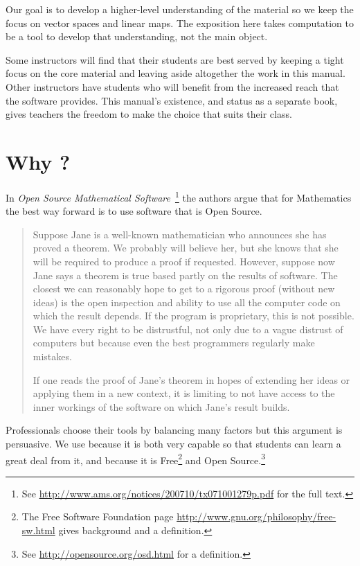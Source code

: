 Our goal is to 
develop a higher-level understanding of the material so we 
keep the focus on vector spaces and linear maps.
The exposition here takes computation to be
a tool to develop that understanding, not the main object.

Some instructors will find 
that their students are best served by
keeping a tight focus on the
core material and leaving aside altogether 
the work in this manual. 
Other instructors
have students who will benefit from the increased reach that the software
provides.
This manual's existence, and status as a separate book, gives teachers the 
freedom to make the choice that suits their class.


\section{Why \Sage?}
In 
\textit{Open Source Mathematical Software\,} \citep{JoynerStein07}\footnote{See 
\protect\url{http://www.ams.org/notices/200710/tx071001279p.pdf} for the 
full text.}
the authors argue that for Mathematics the best way forward
is to use software that is Open Source.

\begin{quotation}\small
Suppose Jane is a well-known mathematician who announces
she has proved a theorem. We probably will believe
her, but she knows that she will be required to produce
a proof if requested. However, suppose now Jane says a
theorem is true based partly on the results of software. The
closest we can reasonably hope to get to a rigorous proof
(without new ideas) is the open inspection and ability to use
all the computer code on which the result depends. If the
program is proprietary, this is not possible. We have every
right to be distrustful, not only due to a vague distrust of
computers but because even the best programmers regularly
make mistakes.

If one reads the proof of Jane’s theorem in hopes of
extending her ideas or applying them in a new context, it
is limiting to not have access to the inner workings of the
software on which Jane’s result builds.
\end{quotation}  
Professionals choose their tools by balancing many factors but
this argument is persuasive.
We use \Sage{} because it is both very capable 
so that students can 
learn a great deal from it,
and because it is 
Free\footnote{The Free Software Foundation page 
\protect\url{http://www.gnu.org/philosophy/free-sw.html} 
gives background and a definition.} 
and Open Source.\footnote{See \protect\url{http://opensource.org/osd.html} 
for a definition.} 




